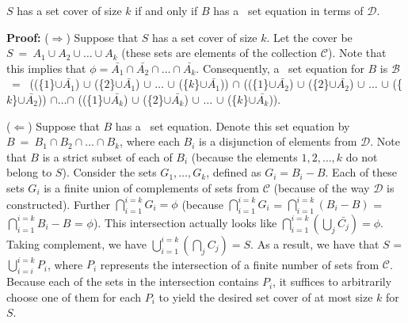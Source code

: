 \begin{clm}
$S$ has a set cover of size $k$ if and only if $B$ has a \kcnf\ set equation in
terms of $\mathcal{D}$.
\end{clm}

\noindent\textbf{Proof:}
($\Rightarrow$) Suppose that $S$ has a set cover of size $k$. Let the cover be
$S~=~A_1\cup A_2\cup\ldots\cup A_k$ (these sets are elements of the collection
$\mathcal{C}$). Note that this implies that
$\phi=\bar{A_1}\cap\bar{A_2}\cap\ldots\cap\bar{A_k}$.
Consequently, a \kcnf\ set equation for $B$ is $\mathcal{B}$~=~
((\{$1$\}$\cup$$\bar{A_1}$) $\cup$ (\{$2$\}$\cup$$\bar{A_1}$) $\cup$ $\ldots$
$\cup$ (\{$k$\}$\cup$$\bar{A_1}$))
$\cap$
((\{$1$\}$\cup$$\bar{A_2}$) $\cup$ (\{$2$\}$\cup$$\bar{A_2}$) $\cup$ $\ldots$
$\cup$ (\{$k$\}$\cup$$\bar{A_2}$))
$\cap$$\ldots$$\cap$
((\{$1$\}$\cup$$\bar{A_k}$) $\cup$ (\{$2$\}$\cup$$\bar{A_k}$) $\cup$ $\ldots$
$\cup$ (\{$k$\}$\cup$$\bar{A_k}$)).

($\Leftarrow$) Suppose that $B$ has a \kcnf\ set equation. Denote this set
equation by $B~=~B_1\cap B_2\cap\ldots\cap B_k$, where each $B_i$ is a
disjunction of elements from $\mathcal{D}$. Note that $B$ is a strict subset of
each of $B_i$ (because the elements $1, 2, \ldots, k$ do not belong to $S$).
Consider the sets $G_1, \ldots, G_k$, defined as $G_i = B_i - B$. Each of these
sets $G_i$ is a finite union of complements of sets from $\mathcal{C}$ (because
of the way $\mathcal{D}$ is constructed). Further
$\displaystyle\bigcap_{i=1}^{i=k}G_i = \phi$ 
(because 
$\displaystyle\bigcap_{i=1}^{i=k}G_i$ = $\displaystyle\bigcap_{i=1}^{i=k}(B_i - B)$ 
= $\displaystyle\bigcap_{i=1}^{i=k}B_i - B$ = $\phi$).
This intersection actually looks like 
$\displaystyle\bigcap_{i=1}^{i=k}(\displaystyle\bigcup_j\bar{C_j}) = \phi$. 
Taking complement, we have 
$\displaystyle\bigcup_{i=1}^{i=k}(\displaystyle\bigcap_j C_j) = S$. As a
result, we have that $S$ = $\displaystyle\bigcup_{i=i}^{i=k}P_i$, where $P_i$
represents the intersection of a finite number of sets from $\mathcal{C}$.
Because each of the sets in the intersection contains $P_i$, it suffices to
arbitrarily choose one of them for each $P_i$ to yield the desired set cover of
at most size $k$ for $S$. \hfill\fbox{}

